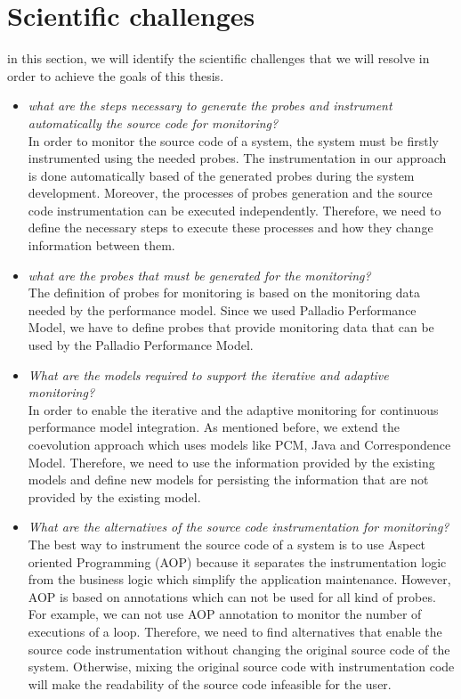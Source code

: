 \section{Scientific challenges}
\label{sec:Scientific challenges}
in this section, we will identify the scientific challenges that we will resolve in order to achieve the goals of this thesis. 
\begin{itemize}
\item \textit{what are the steps necessary to generate the probes and instrument automatically the source code for monitoring?} \\
In order to monitor the source code of a system, the system must be firstly instrumented using the needed probes. The instrumentation in our approach is done automatically based of the generated probes during the system development. Moreover, the processes of probes generation and the source code instrumentation can be executed independently. Therefore, we need to define the necessary steps to execute these processes and how they change information between them.

\item \textit{what are the probes that must be generated for the monitoring?}\\
The definition of probes for monitoring is based on the monitoring data needed by the performance model. Since we used Palladio Performance Model, we have to define probes that provide monitoring data that can be used by the Palladio Performance Model.
 
\item \textit{What are the models required to support the iterative and adaptive monitoring?}\\
In order to enable the iterative and the adaptive monitoring for continuous performance model integration. As mentioned before, we extend the coevolution approach which uses models like PCM, Java and Correspondence Model. Therefore, we need to use the information provided by the existing models and define new models for persisting the information that are not provided by the existing model.

\item \textit{What are the alternatives of the source code instrumentation for monitoring?}\\
The best way to instrument the source code of a system is to use Aspect oriented Programming (AOP) because it separates the instrumentation logic from the business logic which simplify the application maintenance. However, AOP is based on annotations which can not be used for all kind of probes. For example, we can not use AOP annotation to monitor the number of executions of a loop. Therefore, we need to find alternatives that enable the source code instrumentation without changing the original source code of the system. Otherwise, mixing the original source code with instrumentation code will make the readability of the source code infeasible for the user. 


\end{itemize}
